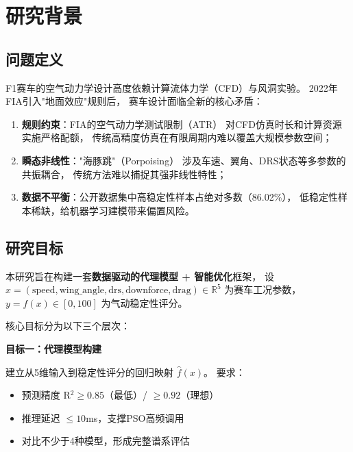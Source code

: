 \section{研究背景}

\subsection{问题定义}

F1赛车的空气动力学设计高度依赖计算流体力学（CFD）与风洞实验。
2022年FIA引入"地面效应"规则后，
赛车设计面临全新的核心矛盾：

\begin{enumerate}
    \item \textbf{规则约束}：FIA的空气动力学测试限制（ATR）
        对CFD仿真时长和计算资源实施严格配额，
        传统高精度仿真在有限周期内难以覆盖大规模参数空间；
    \item \textbf{瞬态非线性}："海豚跳"（Porpoising）
        涉及车速、翼角、DRS状态等多参数的共振耦合，
        传统方法难以捕捉其强非线性特性；
    \item \textbf{数据不平衡}：公开数据集中高稳定性样本占绝对多数（86.02\%），
        低稳定性样本稀缺，给机器学习建模带来偏置风险。
\end{enumerate}

\subsection{研究目标}

本研究旨在构建一套\textbf{数据驱动的代理模型 + 智能优化}框架，
设 $x = (\text{speed}, \text{wing\_angle}, \text{drs}, \text{downforce}, \text{drag}) \in \mathbb{R}^5$
为赛车工况参数，
$y = f(x) \in [0, 100]$ 为气动稳定性评分。

核心目标分为以下三个层次：

\vspace{0.3cm}

\noindent
\textbf{目标一：代理模型构建}

建立从5维输入到稳定性评分的回归映射 $\hat{f}(x)$。
要求：
\begin{itemize}
    \item 预测精度 R$^2 \geq 0.85$（最低）/ $\geq 0.92$（理想）
    \item 推理延迟 $\leq 10$ms，支撑PSO高频调用
    \item 对比不少于4种模型，形成完整谱系评估
\end{itemize}

\vspace{0.3cm}

